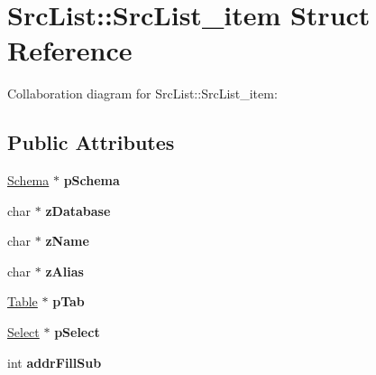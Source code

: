 \hypertarget{struct_src_list_1_1_src_list__item}{\section{Src\+List\+:\+:Src\+List\+\_\+item Struct Reference}
\label{struct_src_list_1_1_src_list__item}
}


Collaboration diagram for Src\+List\+:\+:Src\+List\+\_\+item\+:
\subsection*{Public Attributes}
\begin{DoxyCompactItemize}
\item 
\hypertarget{struct_src_list_1_1_src_list__item_a021ffb4d9282b6ce171bd57c4da97bf3}{\hyperlink{struct_schema}{Schema} $\ast$ {\bfseries p\+Schema}}\label{struct_src_list_1_1_src_list__item_a021ffb4d9282b6ce171bd57c4da97bf3}

\item 
\hypertarget{struct_src_list_1_1_src_list__item_a2f7bf0921794dc46d74d2546fc10f7de}{char $\ast$ {\bfseries z\+Database}}\label{struct_src_list_1_1_src_list__item_a2f7bf0921794dc46d74d2546fc10f7de}

\item 
\hypertarget{struct_src_list_1_1_src_list__item_afee5c5a84594fed8100be3cdb3e3ff1c}{char $\ast$ {\bfseries z\+Name}}\label{struct_src_list_1_1_src_list__item_afee5c5a84594fed8100be3cdb3e3ff1c}

\item 
\hypertarget{struct_src_list_1_1_src_list__item_a461ef8d80828ed8dd4409b9244ae2919}{char $\ast$ {\bfseries z\+Alias}}\label{struct_src_list_1_1_src_list__item_a461ef8d80828ed8dd4409b9244ae2919}

\item 
\hypertarget{struct_src_list_1_1_src_list__item_a8779b2d10d0e25af78ad90e57f9cd4f6}{\hyperlink{struct_table}{Table} $\ast$ {\bfseries p\+Tab}}\label{struct_src_list_1_1_src_list__item_a8779b2d10d0e25af78ad90e57f9cd4f6}

\item 
\hypertarget{struct_src_list_1_1_src_list__item_ab44822fca7618c4f41f4f770ad41425b}{\hyperlink{struct_select}{Select} $\ast$ {\bfseries p\+Select}}\label{struct_src_list_1_1_src_list__item_ab44822fca7618c4f41f4f770ad41425b}

\item 
\hypertarget{struct_src_list_1_1_src_list__item_a1fb4f55d13641e11f07c3e535fd7cf1d}{int {\bfseries addr\+Fill\+Sub}}\label{struct_src_list_1_1_src_list__item_a1fb4f55d13641e11f07c3e535fd7cf1d}


\end{DoxyCompactItemize}
